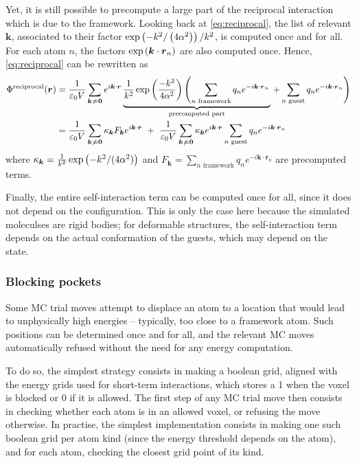 \documentclass[main.tex]{subfiles}
\begin{document}
Yet, it is still possible to precompute a large part of the reciprocal interaction which is due to the framework. Looking back at \cref{eq:reciprocal}, the list of relevant $\boldsymbol{k}$, associated to their factor $\exp\left(-k^2/\left(4\alpha^2\right)\right)/k^2$, is computed once and for all. For each atom $n$, the factors $\exp\left(\boldsymbol{k}\cdot\boldsymbol{r}_n\right)$ are also computed once. Hence, \cref{eq:reciprocal} can be rewritten as
\[\begin{split}\Phi^\text{reciprocal}(\boldsymbol r) &= \frac{1}{\varepsilon_0V}\sum_{\boldsymbol k\neq \boldsymbol 0}e^{i\boldsymbol{k}\cdot\boldsymbol{r}}\underbrace{\frac1{k^2}\exp\paren{\frac{-k^2}{4\alpha^2}}\left(\sum_{n\text{ framework}} q_n e^{-i\boldsymbol k\cdot\boldsymbol r_n}\right.}_\text{precomputed part}\left. + \sum_{n\text{ guest}} q_n e^{-i\boldsymbol k\cdot\boldsymbol r_n}\right)
\\&= \frac1{\varepsilon_0V}\sum_{\boldsymbol k\neq \boldsymbol 0} \kappa_{\boldsymbol k} F_{\boldsymbol k} e^{i\boldsymbol{k}\cdot\boldsymbol{r}} \ +\  \frac1{\varepsilon_0V}\sum_{\boldsymbol k\neq \boldsymbol 0} \kappa_{\boldsymbol k} e^{i\boldsymbol{k}\cdot\boldsymbol{r}} \sum_{n\text{ guest}} q_n e^{-i\boldsymbol k\cdot\boldsymbol r_n}
\label{eq:reciprocal_decomposed}\end{split}\]
where $\kappa_{\boldsymbol k} = \frac1{k^2}\exp\left(-k^2/(4\alpha^2)\right)$ and $F_{\boldsymbol k} = \sum\limits_{n\text{ framework}} q_n e^{-i\boldsymbol k\cdot\boldsymbol r_n}$ are precomputed terms.

Finally, the entire self-interaction term can be computed once for all, since it does not depend on the configuration. This is only the case here because the simulated moleculses are rigid bodies; for deformable structures, the self-interaction term depends on the actual conformation of the guests, which may depend on the state.

\subsubsection{Blocking pockets}

Some MC trial moves attempt to displace an atom to a location that would lead to unphysically high energies -- typically, too close to a framework atom. Such positions can be determined once and for all, and the relevant MC moves automatically refused without the need for any energy computation.

To do so, the simplest strategy consists in making a boolean grid, aligned with the energy grids used for short-term interactions, which stores a 1 when the voxel is blocked or 0 if it is allowed. The first step of any MC trial move then consists in checking whether each atom is in an allowed voxel, or refusing the move otherwise. In practise, the simplest implementation consists in making one such boolean grid per atom kind (since the energy threshold depends on the atom), and for each atom, checking the closest grid point of its kind.
\end{document}
